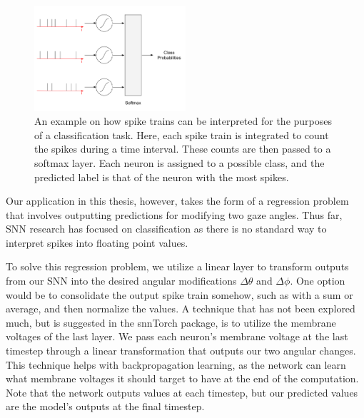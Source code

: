 \documentclass [MS] {UCLAthesis}
\begin{document}
\begin{figure}
    \centering
    \includegraphics[width=0.5\textwidth]{snn_classifier}
    \caption[Interpreting spike trains to classify inputs]{An example on how spike trains can be interpreted for the purposes of a classification task. Here, each spike train is integrated to count the spikes during a time interval. These counts are then passed to a softmax layer. Each neuron is assigned to a possible class, and the predicted label is that of the neuron with the most spikes.}
    \label{fig:snn_classifier}
\end{figure}

Our application in this thesis, however, takes the form of a regression problem that involves outputting predictions for modifying two gaze angles. Thus far, SNN research has focused on classification as there is no standard way to interpret spikes into floating point values.

To solve this regression problem, we utilize a linear layer to transform outputs from our SNN into the desired angular modifications $\Delta\theta$ and $\Delta\phi$. One option would be to consolidate the output spike train somehow, such as with a sum or average, and then normalize the values. A technique that has not been explored much, but is suggested in the snnTorch package, is to utilize the membrane voltages of the last layer. We pass each neuron's membrane voltage at the last timestep through a linear transformation that outputs our two angular changes. This technique helps with backpropagation learning, as the network can learn what membrane voltages it should target to have at the end of the computation. Note that the network outputs values at each timestep, but our predicted values are the model's outputs at the final timestep.


\end{document}
